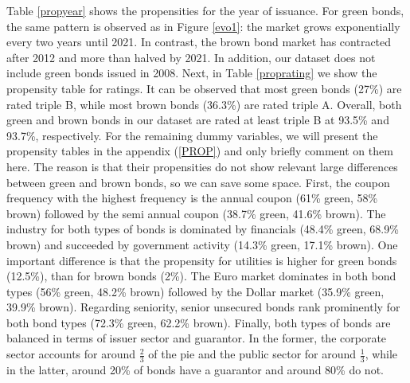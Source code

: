 Table \ref{propyear} shows the propensities for the year of issuance. For green bonds, the same pattern is observed as in Figure \ref{evo1}: the market grows exponentially every two years until 2021. In contrast, the brown bond market has contracted after 2012 and more than halved by 2021. In addition, our dataset does not include green bonds issued in 2008. Next, in Table \ref{proprating} we show the propensity table for ratings. It can be observed that most green bonds (27\%) are rated triple B, while most brown bonds (36.3\%) are rated triple A. Overall, both green and brown bonds in our dataset are rated at least triple B at 93.5\% and 93.7\%, respectively. For the remaining dummy variables, we will present the propensity tables in the appendix (\ref{PROP}) and only briefly comment on them here. The reason is that their propensities do not show relevant large differences between green and brown bonds, so we can save some space. First, the coupon frequency with the highest frequency is the annual coupon (61\% green, 58\% brown) followed by the semi annual coupon (38.7\% green, 41.6\% brown). The industry for both types of bonds is dominated by financials (48.4\% green, 68.9\% brown) and succeeded by government activity (14.3\% green, 17.1\% brown). One important difference is that the propensity for utilities is higher for green bonds (12.5\%), than for brown bonds (2\%). The Euro market dominates in both bond types (56\% green, 48.2\% brown) followed by the Dollar market (35.9\% green, 39.9\% brown). Regarding seniority, senior unsecured bonds rank prominently for both bond types (72.3\% green, 62.2\% brown). Finally, both types of bonds are balanced in terms of issuer sector and guarantor. In the former, the corporate sector accounts for around $\frac{2}{3}$ of the pie and the public sector for around $\frac{1}{3}$, while in the latter, around 20\% of bonds have a guarantor and around 80\% do not. 

